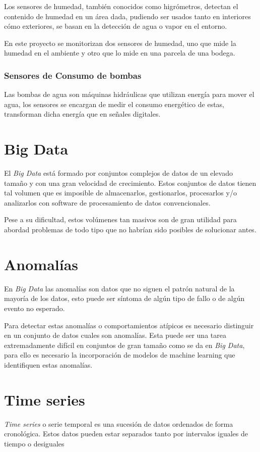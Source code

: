 Los sensores de humedad, también conocidos como higrómetros, detectan el contenido de humedad en un área dada, pudiendo ser usados tanto en interiores cómo exteriores, se basan en la detección de agua o vapor en el entorno.

En este proyecto se monitorizan dos sensores de humedad, uno que mide la humedad en el ambiente y otro que lo mide en una parcela de una bodega.

\subsubsection{Sensores de Consumo de bombas}

Las bombas de agua son máquinas hidráulicas que utilizan energía para mover el agua, los sensores se encargan de medir el consumo energético de estas, transforman dicha energía que en señales digitales.  

\section{Big Data}

El \textit{Big Data} está formado por conjuntos complejos de datos de un elevado tamaño y con una gran velocidad de crecimiento. Estos conjuntos de datos tienen tal volumen que es imposible de almacenarlos, gestionarlos, procesarlos y/o analizarlos con software de procesamiento de datos convencionales.

Pese a su dificultad, estos volúmenes tan masivos son de gran utilidad para abordad problemas de todo tipo que no habrían sido posibles de solucionar antes. \cite{pagina:Oracle_big_data}

\section{Anomalías}

En \textit{Big Data} las anomalías son datos que no siguen el patrón natural de la mayoría de los datos, esto puede ser síntoma de algún tipo de fallo o de algún evento no esperado. 

Para detectar estas anomalías o comportamientos atípicos es necesario distinguir en un conjunto de datos cuales son anomalías. Esta puede ser una tarea extremadamente difícil en conjuntos de gran tamaño como se da en \textit{Big Data}, para ello es necesario la incorporación de modelos de machine learning que identifiquen estas anomalías.\cite{pagina:anomalias}


\section{Time series}
\textit{Time series} o serie temporal es una sucesión de datos ordenados de forma cronológica. Estos datos pueden estar separados tanto por intervalos iguales de tiempo o desiguales

